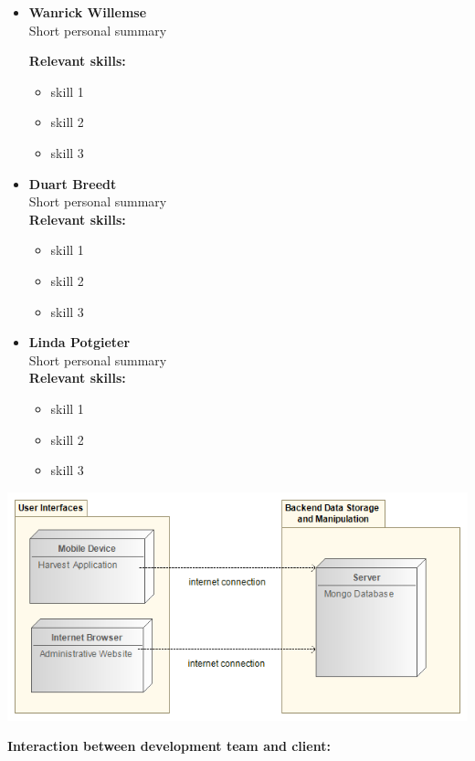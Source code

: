\documentclass[11pt,pressrelease]{newlfm} %
\begin{document}
\begin{newlfm}
\begin{singlespace}
\begin{itemize}
		\item \textbf{Wanrick Willemse}
		\\
		\textnormal Short personal summary
		
		\textbf{\small Relevant skills:}
		\begin{itemize}
			\item skill 1
			\item skill 2
			\item skill 3
		\end{itemize}
		
		
		\item \textbf{Duart Breedt}
		\\
		\textnormal Short personal summary
		\\
		\textbf{\small Relevant skills:}
		\begin{itemize}
			\item skill 1
			\item skill 2
			\item skill 3
		\end{itemize}
		
		
		\item \textbf{Linda Potgieter}
		\\
		\textnormal Short personal summary
		\\
		\textbf{\small Relevant skills:}
		\begin{itemize}
			\item skill 1
			\item skill 2
			\item skill 3
		\end{itemize}
		
		
	\end{itemize}
	
\begin{center}
	\includegraphics[width=0.5\linewidth]{deployment.png}
\end{center}

\newpage

\large \textbf{Interaction between development team and client:}


\end{singlespace}
\end{newlfm}
\end{document}
